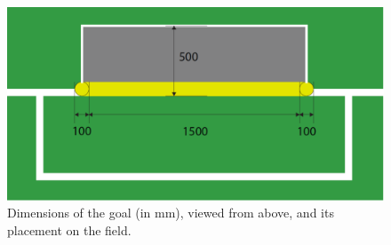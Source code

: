 \documentclass[12pt]{article}
\begin{document}
\begin{figure}[t!]
\begin{center}
\leavevmode
\includegraphics[width=1\columnwidth]{figs/goalDimensions.pdf}
\caption{Dimensions of the goal (in mm), viewed from above, and its placement on the field.}
\label{fig:goal_dimensions}
\end{center}
\end{figure}
\end{document}
